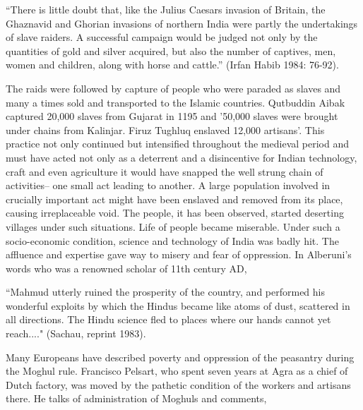 \begin{myquote}
``There is little doubt that, like the Julius Caesars invasion of Britain, the Ghaznavid and Ghorian invasions of northern India were partly the undertakings of slave raiders. A successful campaign would be judged not only by the quantities of gold and silver acquired, but also the number of captives, men, women and children, along with horse and cattle.'' (Irfan Habib 1984: 76-92).
\end{myquote}

The raids were followed by capture of people who were paraded as slaves and many a times sold and transported to the Islamic countries. Qutbuddin Aibak captured 20,000 slaves from Gujarat in 1195 and '50,000 slaves were brought under chains from Kalinjar. Firuz Tughluq enslaved 12,000 artisans'. This practice not only continued but intensified throughout the medieval period and must have acted not only as a deterrent and a disincentive for Indian technology, craft and even agriculture it would have snapped the well strung chain of activities– one small act leading to another. A large population involved in crucially important act might have been enslaved and removed from its place, causing irreplaceable void. The people, it has been observed, started deserting villages under such situations. Life of people became miserable. Under such a socio-economic condition, science and technology of India was badly hit. The affluence and expertise gave way to misery and fear of oppression. In Alberuni's words who was a renowned scholar of 11th century AD,

\begin{myquote}
``Mahmud utterly ruined the prosperity of the country, and performed his wonderful exploits by which the Hindus became like atoms of dust, scattered in all directions. The Hindu science fled to places where our hands cannot yet reach...." (Sachau, reprint 1983).
\end{myquote}

Many Europeans have described poverty and oppression of the peasantry during the Moghul rule. Francisco Pelsart, who spent seven years at Agra as a chief of Dutch factory, was moved by the pathetic condition of the workers and artisans there. He talks of administration of Moghuls and comments,

